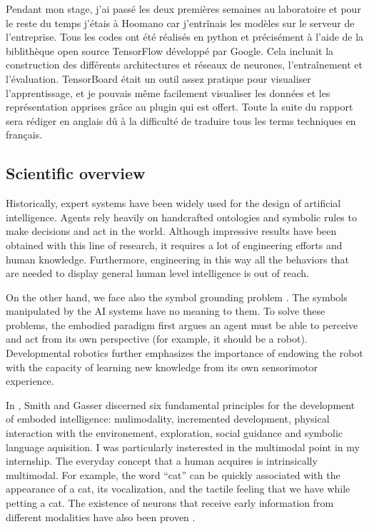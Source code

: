 Pendant mon stage, j'ai passé les deux premières semaines au
laboratoire et pour le reste du temps j'étais à Hoomano car j'entrînais
les modèles sur le serveur de l'entreprise. Tous les codes ont été
réalisés en python et précisément à l'aide de la biblithèque open source
TensorFlow développé par Google. Cela incluait la construction des
différents architectures et réseaux de neurones, l'entraînement et
l'évaluation.
TensorBoard était un outil assez pratique pour visualiser l'apprentissage,
et je pouvais même facilement visualiser les données et les
représentation apprises grâce au plugin qui est offert.
Toute la suite du rapport sera rédiger en anglais dû à la difficulté
de traduire tous les terms techniques en français.

\subsection{Scientific overview}

Historically, expert systems have been widely used for the design
of artificial intelligence. 
Agents rely heavily on handcrafted ontologies and symbolic rules to
make decisions and act in the world.
Although impressive results have been obtained with this line of
research, it requires a lot of engineering efforts and human knowledge.
Furthermore, engineering in this way all the behaviors that are needed
to display general human level intelligence is out of reach.

On the other hand, we face also the symbol grounding problem
\cite{S. Harnad 1990}. The symbols manipulated by the AI systems have
no meaning to them. To solve these problems, the embodied paradigm
\cite{A. Clark 1997} first argues an agent must be able to perceive and
act from its own perspective (for example, it should be a robot).
Developmental robotics \cite{J. Weng 2001} further emphasizes the
importance of endowing the robot with the capacity of learning new
knowledge from its own sensorimotor experience.

In \cite{L. Smith 2005}, Smith and Gasser discerned six fundamental
principles for the development of emboded intelligence: mulimodality,
incremented development, physical interaction with the environement,
exploration, social guidance and symbolic language aquisition.
I was particularly insterested in the multimodal point in my internship.
The everyday concept that a human acquires is intrinsically multimodal.
For example, the word ``cat'' can be quickly associated with the
appearance of a cat, its vocalization, and the tactile feeling that
we have while petting a cat. The existence of neurons that receive
early information from different modalities have also been proven
\cite{S. Molholm 2002}.

